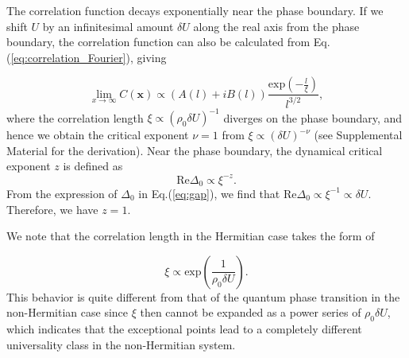 \documentclass[aps,prl,twocolumn,nofootinbib,superscriptaddress,notitlepage,longbibliography]{revtex4-1}
\begin{document}
	The correlation function decays exponentially near the phase boundary. If we
	shift $U$ by an infinitesimal amount $\delta U$ along the real axis from the phase boundary, the correlation function can also be calculated from Eq. (\ref{eq:correlation_Fourier}), giving
	
	\begin{equation}
	\lim_{x\rightarrow\infty}C(\bm{x})\propto(A(l)+iB(l))\frac{\text{exp}(-\frac{l}{\xi})}{l^{3/2}}\label{eq:exponential_decay},
	\end{equation}
	where the correlation length $\xi\propto(\rho_{0}\delta U)^{-1}$ diverges on the phase boundary, and hence we obtain the critical exponent $\nu=1$ from $\xi\propto(\delta U)^{-\nu}$ \cite{Sachdev:2011uj} (see Supplemental Material \cite{SupplementaryMaterial} for the derivation). 
	Near the phase boundary, the dynamical critical exponent $z$ is defined as
	\begin{equation}
		\text{Re}\Delta_0\propto\xi^{-z}.
	\end{equation}
	From the expression of $\Delta_0$ in Eq.(\ref{eq:gap}), we find that $\text{Re}\Delta_0\propto\xi^{-1}\propto\delta U$. Therefore, we have $z=1$. 
	
	We note that the correlation length in the Hermitian case takes the form of
	
	\begin{equation}
	\xi\propto\text{exp}(\frac{1}{\rho_{0}\delta U}).
	\end{equation}
	This behavior is quite different from that of the quantum phase transition in the non-Hermitian
	case since $\xi$ then cannot be expanded as a power series of $\rho_{0}\delta U$,
	which indicates that the exceptional points lead to a completely
	different universality class in the non-Hermitian system.
	
\end{document}
